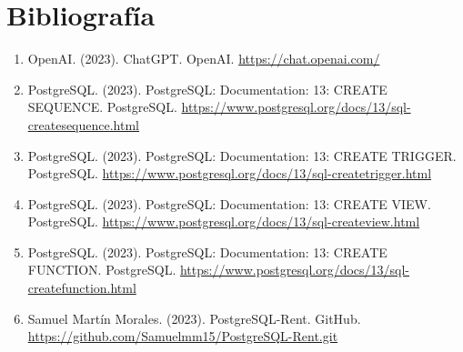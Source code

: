 \documentclass[11pt]{report}
\begin{document}
	\chapter{Bibliografía}
	\begin{enumerate}
		\item OpenAI. (2023). ChatGPT. OpenAI. \url{https://chat.openai.com/}
		\item PostgreSQL. (2023). PostgreSQL: Documentation: 13: CREATE SEQUENCE. PostgreSQL. \url{https://www.postgresql.org/docs/13/sql-createsequence.html}
		\item PostgreSQL. (2023). PostgreSQL: Documentation: 13: CREATE TRIGGER. PostgreSQL. \url{https://www.postgresql.org/docs/13/sql-createtrigger.html}
		\item PostgreSQL. (2023). PostgreSQL: Documentation: 13: CREATE VIEW. PostgreSQL. \url{https://www.postgresql.org/docs/13/sql-createview.html}
		\item PostgreSQL. (2023). PostgreSQL: Documentation: 13: CREATE FUNCTION. PostgreSQL. \url{https://www.postgresql.org/docs/13/sql-createfunction.html}
		\item Samuel Martín Morales. (2023). PostgreSQL-Rent. GitHub. \url{https://github.com/Samuelmm15/PostgreSQL-Rent.git}
	\end{enumerate}	
\end{document}
